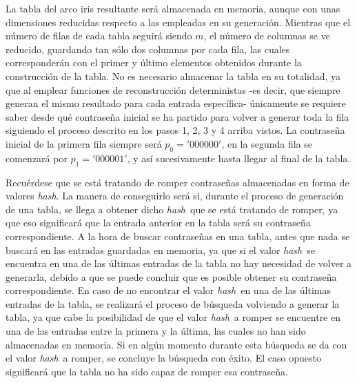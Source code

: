 \documentclass[12pt,spanish,listoffigures,listoftables]{tfgetsinf}
\newcommand{\hash}{\textit{hash}}
\begin{document}
La tabla del arco iris resultante será almacenada en memoria, aunque con unas dimensiones reducidas respecto a las empleadas en su generación. Mientras que el número de filas de cada tabla seguirá siendo $m$, el número de columnas se ve reducido, guardando tan sólo dos columnas por cada fila, las cuales corresponderán con el primer y último elementos obtenidos durante la construcción de la tabla. No es necesario almacenar la tabla en su totalidad, ya que al emplear funciones de reconstrucción deterministas -es decir, que siempre generan el mismo resultado para cada entrada específica- únicamente se requiere saber desde qué contraseña inicial se ha partido para volver a generar toda la fila siguiendo el proceso descrito en los pasos 1, 2, 3 y 4 arriba vistos. La contraseña inicial de la primera fila siempre será $p_0 = '000000'$, en la segunda fila se comenzará por $p_1 = '000001'$, y así sucesivamente hasta llegar al final de la tabla.

Recuérdese que se está tratando de romper contraseñas almacenadas en forma de valores \hash. La manera de conseguirlo será si, durante el proceso de generación de una tabla, se llega a obtener dicho \hash~que se está tratando de romper, ya que eso significará que la entrada anterior en la tabla será su contraseña correspondiente. A la hora de buscar contraseñas en una tabla, antes que nada se buscará en las entradas guardadas en memoria, ya que si el valor \hash~se encuentra en una de las últimas entradas de la tabla no hay necesidad de volver a generarla, debido a que se puede concluir que es posible obtener su contraseña correspondiente. En caso de no encontrar el valor \hash~en una de las últimas entradas de la tabla, se realizará el proceso de búsqueda volviendo a generar la tabla, ya que cabe la posibilidad de que el valor \hash~a romper se encuentre en una de las entradas entre la primera y la última, las cuales no han sido almacenadas en memoria. Si en algún momento durante esta búsqueda se da con el valor \hash~a romper, se concluye la búsqueda con éxito. El caso opuesto significará que la tabla no ha sido capaz de romper esa contraseña.
\end{document}
